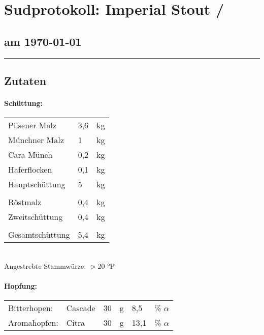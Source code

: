 \documentclass[12pt,oneside,a4paper]{scrartcl}
\begin{document}
	\begin{minipage}[c]{0.70\textwidth}
		\section*{\hspace{-.4cm}Sudprotokoll: Imperial Stout / }
	\end{minipage}
	\begin{minipage}[c]{0.29\textwidth}
		\subsection*{am \today}
	\end{minipage}
	\rule{\textwidth}{1pt}
%
\subsection*{Zutaten}
%
\paragraph{Schüttung:}
	\begin{tabular}[t]{m{8cm} m{2cm} m{1cm}}
		Pilsener Malz & 3,6 & kg \bigstrut\\
		Münchner Malz & 1 & kg \bigstrut\\
		Cara Münch & 0,2 & kg \bigstrut\\
		Haferflocken & 0,1 & kg \bigstrut\\ \hline
		Hauptschüttung & 5 & kg \bigstrut\\
		&&\\
		Röstmalz & 0,4 & kg \bigstrut\\\hline
		Zweitschüttung & 0,4 & kg \bigstrut\\\hline\hline
		&&\\
		Gesamtschüttung & 5,4 & kg\bigstrut
	\end{tabular}\\

\vspace{.25cm}
\hspace{1cm}Angestrebte Stammwürze: $>$20 °P
%
\paragraph{Hopfung:}
	\begin{tabular}[t]{m{2.5cm} m{5cm} m{0.5cm} m{1cm} m{0.5cm} m{1cm}}
		Bitterhopen: & Cascade & 30 & g & 8,5 & \% $\alpha$ \\
		Aromahopfen: & Citra & 30 & g & 13,1 &  \% $\alpha$
	\end{tabular}\\
\end{document}
